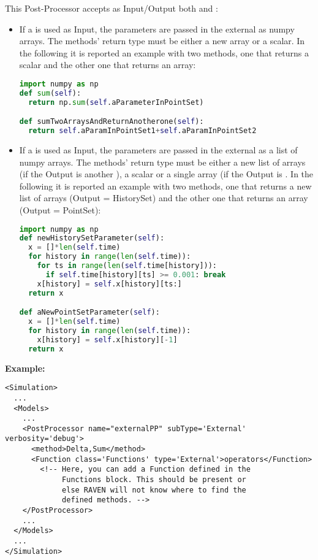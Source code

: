   This Post-Processor accepts as Input/Output both  and :
   \begin{itemize}
    \item If a   is used as Input, the parameters are passed in the external  
  as numpy arrays. The methods' return type must be either a new array or a scalar. In the following it is reported an example
  with two methods, one that returns a scalar and the other one that returns an array:
      \begin{lstlisting}[language=python]
import numpy as np
def sum(self):
  return np.sum(self.aParameterInPointSet)

def sumTwoArraysAndReturnAnotherone(self):
  return self.aParamInPointSet1+self.aParamInPointSet2
      \end{lstlisting}
    \item If a   is used as Input, the parameters are passed in the external  
     as a list of numpy arrays. The methods' return type must be either a new list of arrays (if the Output is another
     ), a scalar or a single array (if the  Output is   . In the following it
     is reported an example
     with two methods, one that returns a new list of arrays (Output = HistorySet) and the other one that returns an array (Output =
     PointSet):
      \begin{lstlisting}[language=python]
import numpy as np
def newHistorySetParameter(self):
  x = []*len(self.time)
  for history in range(len(self.time)):
    for ts in range(len(self.time[history])):
      if self.time[history][ts] >= 0.001: break
    x[history] = self.x[history][ts:]
  return x

def aNewPointSetParameter(self):
  x = []*len(self.time)
  for history in range(len(self.time)):
    x[history] = self.x[history][-1]
  return x
      \end{lstlisting}
   \end{itemize}

\textbf{Example:}
\begin{lstlisting}[style=XML,morekeywords={subType,debug,name,class,type}]
<Simulation>
  ...
  <Models>
    ...
    <PostProcessor name="externalPP" subType='External' verbosity='debug'>
      <method>Delta,Sum</method>
      <Function class='Functions' type='External'>operators</Function>
        <!-- Here, you can add a Function defined in the
             Functions block. This should be present or
             else RAVEN will not know where to find the
             defined methods. -->
    </PostProcessor>
    ...
  </Models>
  ...
</Simulation>
\end{lstlisting}

